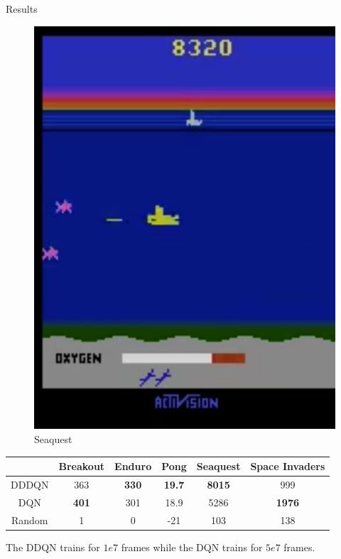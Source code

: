 \documentclass{beamer}
\begin{document}
\begin{frame}{Results}
\begin{minipage}[t]{\textwidth}
\begin{minipage}{0.3\textwidth}
\begin{figure}
    \includegraphics[height=0.35\textheight]{img/Seaquest}
    \caption*{Seaquest}
    \end{figure}
    \end{minipage}
\end{minipage}

\begin{minipage}[t]{\textwidth}
    \begin{table}
    \begin{threeparttable}
        \begin{tabular}{||c c c c c c||}
        \hline
        & Breakout & Enduro & Pong & Seaquest & Space Invaders \\ [0.5ex]
        \hline\hline
        DDDQN & 363 & \textbf{330} & \textbf{19.7} & \textbf{8015} & 999 \\
        \hline
        DQN & \textbf{401} & 301 & 18.9 & 5286 & \textbf{1976} \\
        \hline
        Random & 1 & 0 & -21 & 103 & 138 \\
        \hline
        \end{tabular}
    \begin{tablenotes}
        \small
        \item The DDQN trains for $1e7$ frames while the DQN trains for $5e7$ frames.
    \end{tablenotes}
    \end{threeparttable}
    \end{table}
\end{minipage}


\end{frame}
\end{document}
